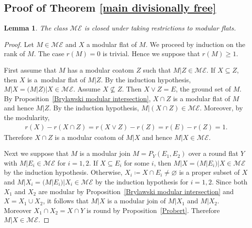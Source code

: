 \documentclass[pdftex]{sigma}
\numberwithin{equation}{section}
\newtheorem{Lemma}[Theorem]{Lemma}
\begin{document}
\subsection{Proof of Theorem \ref{main divisionally free}}
\begin{Lemma}\label{restriction modular flat}
The class $ \mathcal{ME} $ is closed under taking restrictions to modular flats.
\end{Lemma}
\begin{proof}
Let $ M \in \mathcal{ME} $ and $ X $ a modular flat of $ M $.
We proceed by induction on the rank of $ M $.
The case $ r(M)=0 $ is trivial.
Hence we suppose that $ r(M) \geq 1 $.

First assume that $ M $ has a modular coatom $ Z $ such that $ M|Z \in \mathcal{ME} $.
If $ X \subseteq Z $, then $ X $ is a~modular flat of $ M|Z $.
By the induction hypothesis, $ M|X = (M|Z)|X \in \mathcal{ME} $.
Assume $ X \not\subseteq Z $.
Then $ X \vee Z = E $, the ground set of $ M $.
By Proposition~\ref{Brylawski modular intersection}, $ X \cap Z $ is a modular flat of $ M $ and hence $ M|Z $.
By the induction hypothesis, $ M|(X \cap Z) \in \mathcal{ME} $.
Moreover, by the modularity,
\begin{gather*}
r(X) - r(X \cap Z) = r(X \vee Z) - r(Z) = r(E) - r(Z) = 1.
\end{gather*}
Therefore $ X \cap Z $ is a modular coatom of $ M|X $ and hence $ M|X \in \mathcal{ME} $.

Next we suppose that $ M $ is a modular join $ M = P_{Y}(E_{1}, E_{2}) $ over a round flat $ Y $ with $ M|E_{i} \in \mathcal{ME} $ for $ i = 1,2 $.
If $ X \subseteq E_{i} $ for some $ i $, then $ M|X = (M|E_{i})|X \in \mathcal{ME} $ by the induction hypothesis.
Otherwise, $ X_{i} \coloneqq X \cap E_{i} \neq \varnothing $ is a proper subset of $ X $ and $ M|X_{i} = (M|E_{i})|X_{i} \in \mathcal{ME} $ by the induction hypothesis for $ i = 1,2 $.
Since both $ X_{1} $ and $ X_{2} $ are modular by Proposition~\ref{Brylawski modular intersection} and $ X = X_{1} \cup X_{2} $, it follows that $ M|X $ is a modular join of $ M|X_{1} $ and $ M|X_{2} $.
Moreover $ X_{1} \cap X_{2} = X \cap Y $ is round by Proposition~\ref{Probert}.
Therefore $ M|X \in \mathcal{ME} $.
\end{proof}
\end{document}
